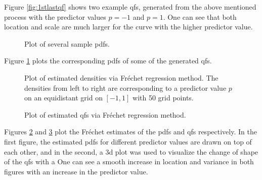 Figure \ref{fig:1stlastqf} shows two example qfs, generated from the above mentioned
process with the predictor values $p=-1$ and $p=1$. One can see that both location and
scale are much larger for the curve with the higher predictor value.

\begin{figure}[h]
    \centering
    \resizebox{1\textwidth}{!}{}
    \caption[Several sampled pdfs]{Plot of several sample pdfs.}
    \label{fig:some_densities}
\end{figure}

Figure \ref{fig:some_densities} plots the corresponding pdfs of some of the generated qfs.

\begin{figure}[h]
    \centering
    \resizebox{1\textwidth}{!}{}
    \caption[Estimated pdfs from Fréchet method]{Plot of estimated densities via Fréchet regression method.
    The densities from left to right are corresponding to a predictor value $p$ on an
    equidistant grid on $[-1,1]$ with 50 grid points.}
    \label{fig:frechet_estimates}
\end{figure}

\begin{figure}[h]
    \centering
    \resizebox{1\textwidth}{!}{}
    \caption[Estimated qfs from Fréchet method]{Plot of estimated qfs via Fréchet regression method.}
    \label{fig:frechet_estimates_3d}
\end{figure}

Figures \ref{fig:frechet_estimates} and \ref{fig:frechet_estimates_3d} plot the Fréchet
estimates of the pdfs and qfs respectively. In the first figure, the estimated pdfs for
different predictor values are drawn on top of each other, and in the second, a 3d plot
was used to visualize the change of shape of the qfs with a One can see a smooth
increase in location and variance in both figures with an increase in the predictor
value.


